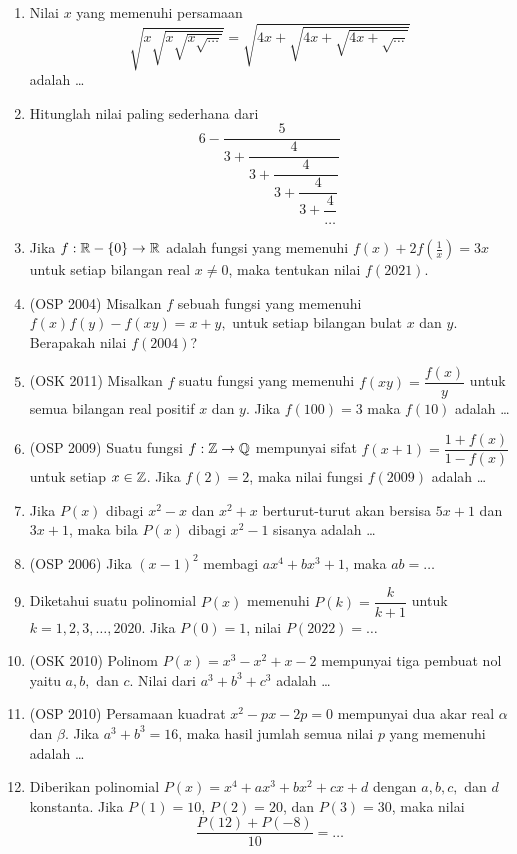 \begin{enumerate}
    \item Nilai $x$ yang memenuhi persamaan
    $$\sqrt{x\sqrt{x\sqrt{x\sqrt{\dots}}}}=\sqrt{4x+\sqrt{4x+\sqrt{4x+\sqrt{\dots}}}}$$
    adalah \dots
    
    \item Hitunglah nilai paling sederhana dari
    $$6-\dfrac{5}{3+\dfrac{4}{3+\dfrac{4}{3+\dfrac{4}{3+\dfrac{4}{\dots}}}}}$$
    
    \item Jika $f:\mathbb R-\{0\} \rightarrow \mathbb R$ adalah fungsi yang memenuhi $f(x)+2f\left(\frac{1}{x}\right)=3x$ untuk setiap bilangan real $x \neq 0$, maka tentukan nilai $f(2021).$
    
    \item (OSP 2004) Misalkan $f$ sebuah fungsi yang memenuhi $f(x)f(y)-f(xy)=x+y,$ untuk setiap bilangan bulat $x$ dan $y$. Berapakah nilai $f(2004)$?
    
    \item (OSK 2011) Misalkan $f$ suatu fungsi yang memenuhi $f(xy) = \dfrac{f(x)}{y}$ untuk semua bilangan real positif $x$ dan $y$. Jika $f(100)=3$ maka $f(10)$ adalah \dots
    
    \item (OSP 2009) Suatu fungsi $f:\mathbb Z \rightarrow \mathbb Q$ mempunyai sifat $f(x+1)=\dfrac{1+f(x)}{1-f(x)}$ untuk setiap $x \in \mathbb Z$. Jika $f(2)=2$, maka nilai fungsi $f(2009)$ adalah \dots
    
    \item Jika $P(x)$ dibagi $x^2-x$ dan $x^2+x$ berturut-turut akan bersisa $5x+1$ dan $3x+1$, maka bila $P(x)$ dibagi $x^2-1$ sisanya adalah \dots
    
    \item (OSP 2006) Jika $(x-1)^2$ membagi $ax^4+bx^3+1$, maka $ab=\dots$
    
    \item Diketahui suatu polinomial $P(x)$ memenuhi $P(k)=\dfrac{k}{k+1}$ untuk $k=1,2,3,\dots,2020$. Jika $P(0)=1$, nilai $P(2022)=\dots$
    
    \item (OSK 2010) Polinom $P(x)=x^3-x^2+x-2$ mempunyai tiga pembuat nol yaitu $a,b,$ dan $c$. Nilai dari $a^3+b^3+c^3$ adalah \dots
    
    \item (OSP 2010) Persamaan kuadrat $x^2-px-2p=0$ mempunyai dua akar real $\alpha$ dan $\beta$. Jika $a^3+b^3=16$, maka hasil jumlah semua nilai $p$ yang memenuhi adalah \dots 
    
    \item Diberikan polinomial $P(x)=x^4+ax^3+bx^2+cx+d$ dengan $a,b,c,$ dan $d$ konstanta. Jika $P(1)=10$, $P(2)=20$, dan  $P(3)=30$, maka nilai
    $$\dfrac{P(12)+P(-8)}{10}=\dots$$
\end{enumerate}

